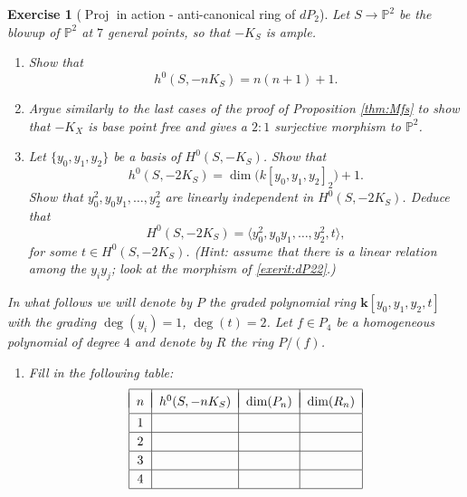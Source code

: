 \documentclass[a4paper,11pt]{amsart}
\newtheorem{exercise}[theorem]{Exercise}
\def\dim{\operatorname{dim}}
\def\deg{\operatorname{deg}}
\def\Proj{\operatorname{Proj}}
\newcommand{\PP}{\mathbb{P}}
\newcommand{\kk}{\textbf{k}}
\begin{document}
\begin{exercise}[{$\Proj$ in action - anti-canonical ring of $dP_2$}]\label{exer:proj}
	Let $S \to \PP^2$ be the blowup of $\PP^2$ at $7$ general points, so that $-K_S$ is ample.
	\begin{enumerate}
		\item Show that 
		\[
		h^0(S,-nK_S) = n(n+1) +1.
		\]
		\item\label{exerit:dP22} Argue similarly to the last cases of the proof of Proposition \ref{thm:Mfs} to show that $-K_X$ is base point free and gives a $2:1$ \emph{surjective} morphism to $\PP^2$.
		\item Let $\{y_0,y_1,y_2\}$ be a basis of $H^0(S,-K_S)$.
		Show that
		\[
		h^0(S,-2K_S) = \dim\big(k[y_0,y_1,y_2]_2\big) + 1.
		\]
		Show that $y_0^2,y_0y_1,\dots,y_2^2$ are linearly independent in $H^0(S,-2K_S)$.
		Deduce that 
		\[
		H^0(S,-2K_S) = \langle y_0^2,y_0y_1,\dots,y_2^2, t \rangle,
		\]
		for some $t \in H^0(S,-2K_S)$.
		{\small(Hint: assume that there is a linear relation among the $y_iy_j$; look at the morphism of \eqref{exerit:dP22}.)}
	\end{enumerate}
	In what follows we will denote by $P$ the graded polynomial ring $\kk[y_0,y_1,y_2,t]$ with the grading $\deg(y_i) = 1$, $\deg(t) =2$.
	Let $f \in P_4$ be a homogeneous polynomial of degree $4$ and denote by $R$ the ring $P/(f)$.
	\begin{enumerate}[resume]
		\item Fill in the following table:
		\[\arraycolsep=6pt\def\arraystretch{1.2}
		\begin{array}{|c|c|c|c|}\hline
			&&&\\[-12pt]
			n & h^0(S,-nK_S) & \dim(P_n) & \dim(R_n) \\[2pt]  \hline
			1 & 			&			&			\\	\hline
			2 & 			&			&			\\	\hline
			3 & 			&			&			\\	\hline
			4 & 			&			&			\\	\hline
		\end{array}
		\]
		\begin{comment}
			\[\arraycolsep=6pt\def\arraystretch{1.2}
			\begin{array}{|c|c|c|c|}\hline
				&&&\\[-12pt]
				n & h^0(S,-nK_S) & \dim(R_n) & \dim(T_n) \\[2pt]  \hline
				1 & 	3		&	3		&	3		\\	\hline
				2 & 	7		&	7		&	7		\\	\hline

\end{comment}
\end{enumerate}
\end{exercise}
\end{document}
